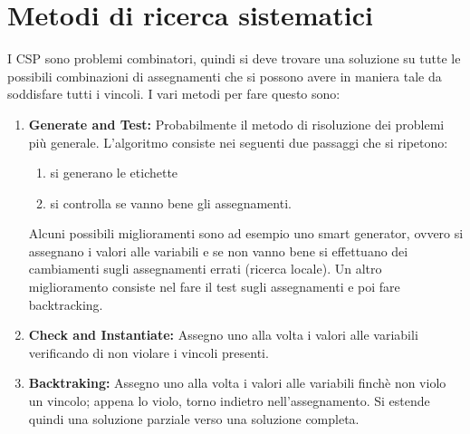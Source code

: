 \section{Metodi di ricerca sistematici}
I CSP sono problemi combinatori, quindi si deve trovare una soluzione su tutte le possibili combinazioni di assegnamenti che si possono avere in maniera tale da soddisfare tutti i vincoli. I vari metodi per fare questo sono:
\begin{enumerate}
    \item \textbf{Generate and Test: }Probabilmente il metodo di risoluzione dei problemi più generale. L’algoritmo consiste nei seguenti due passaggi che si ripetono:
    \begin{enumerate}
        \item si generano le etichette
        \item si controlla se vanno bene gli assegnamenti.
    \end{enumerate}
    Alcuni possibili miglioramenti sono ad esempio uno smart generator, ovvero si assegnano i valori alle variabili e se non vanno bene si effettuano dei cambiamenti sugli assegnamenti errati (ricerca locale). Un altro miglioramento consiste nel fare il test sugli assegnamenti e poi fare backtracking.
    \item \textbf{Check and Instantiate: }Assegno uno alla volta i valori alle variabili verificando di non violare i vincoli presenti.
    \item \textbf{Backtraking:} Assegno uno alla volta i valori alle variabili finchè non violo un vincolo; appena lo violo, torno indietro nell’assegnamento. Si estende quindi una soluzione parziale verso una soluzione completa.
\end{enumerate}
\newpage
